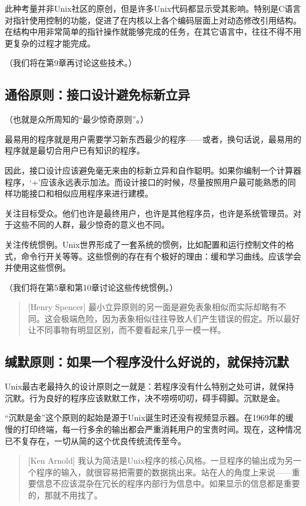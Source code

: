 \documentclass[12pt,oneside]{book}
\begin{document}
此种考量并非Unix社区的原创，但是许多Unix代码都显示受其影响。特别是C语言对指针使用控制的功能，促进了在内核以上各个编码层面上对动态修改引用结构。在结构中用非常简单的指针操作就能够完成的任务，在其它语言中，往往不得不用更复杂的过程才能完成。

（我们将在第9章再讨论这些技术。）

\subsection{通俗原则：接口设计避免标新立异}
（也就是众所周知的“最少惊奇原则”。）

最易用的程序就是用户需要学习新东西最少的程序——或者，换句话说，最易用的程序就是最切合用户已有知识的程序。

因此，接口设计应该避免毫无来由的标新立异和自作聪明。如果你编制一个计算器程序，‘+’应该永远表示加法。而设计接口的时候，尽量按照用户最可能熟悉的同样功能接口和相似应用程序来进行建模。

关注目标受众。他们也许是最终用户，也许是其他程序员，也许是系统管理员。对于这些不同的人群，最少惊奇的意义也不同。

关注传统惯例。Unix世界形成了一套系统的惯例，比如配置和运行控制文件的格式，命令行开关等等。这些惯例的存在有个极好的理由：缓和学习曲线。应该学会并使用这些惯例。

（我们将在第5章和第10章讨论这些传统惯例。）

\begin{quote}[Henry Spencer]
最小立异原则的另一面是避免表象相似而实际却略有不同。这会极端危险，因为表象相似往往导致人们产生错误的假定。所以最好让不同事物有明显区别，而不要看起来几乎一模一样。
\end{quote}


\subsection{缄默原则：如果一个程序没什么好说的，就保持沉默}
Unix最古老最持久的设计原则之一就是：若程序没有什么特别之处可讲，就保持沉默。行为良好的程序应该默默工作，决不唠唠叨叨，碍手碍脚。沉默是金。

“沉默是金”这个原则的起始是源于Unix诞生时还没有视频显示器。在1969年的缓慢的打印终端，每一行多余的输出都会严重消耗用户的宝贵时间。现在，这种情况已不复存在，一切从简的这个优良传统流传至今。

\begin{quote}[Ken Arnold]
我认为简洁是Unix程序的核心风格。一旦程序的输出成为另一个程序的输入，就很容易把需要的数据挑出来。站在人的角度上来说——重要信息不应该混杂在冗长的程序内部行为信息中。如果显示的信息都是重要的，那就不用找了。
\end{quote}
\end{document}
